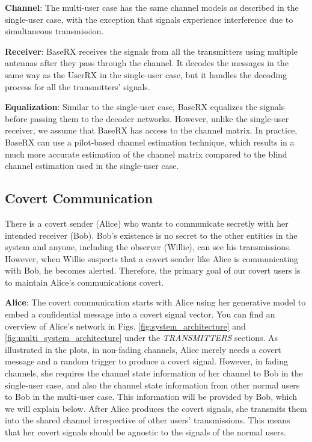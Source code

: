 \textbf{Channel}: The multi-user case has the same channel models as described in the single-user case, with the exception that signals experience interference due to simultaneous transmission.

\textbf{Receiver}: BaseRX receives the signals from all the transmitters using multiple antennas after they pass through the channel. It decodes the messages in the same way as the UserRX in the single-user case, but it handles the decoding process for all the transmitters' signals.

\textbf{Equalization}: Similar to the single-user case, BaseRX equalizes the signals before passing them to the decoder networks. However, unlike the single-user receiver, we assume that BaseRX has access to the channel matrix. In practice, BaseRX can use a pilot-based channel estimation technique, which results in a much more accurate estimation of the channel matrix compared to the blind channel estimation used in the single-user case.

\subsection{Covert Communication}
There is a covert sender (Alice) who wants to communicate secretly with her intended receiver (Bob). Bob's existence is no secret to the other entities in the system and anyone, including the observer (Willie), can see his transmissions. However, when Willie suspects that a covert sender like Alice is communicating with Bob, he becomes alerted. Therefore, the primary goal of our covert users is to maintain Alice's communications covert.

\textbf{Alice}: The covert communication starts with Alice using her generative model to embed a confidential message into a covert signal vector. You can find an overview of Alice's network in Figs. \ref{fig:system_architecture} and \ref{fig:multi_system_architecture} under the \textit{TRANSMITTERS} sections. As illustrated in the plots, in non-fading channels, Alice merely needs a covert message and a random trigger to produce a covert signal. However, in fading channels, she requires the channel state information of her channel to Bob in the single-user case, and also the channel state information from other normal users to Bob in the multi-user case. This information will be provided by Bob, which we will explain below. After Alice produces the covert signals, she transmits them into the shared channel irrespective of other users' transmissions. This means that her covert signals should be agnostic to the signals of the normal users.

